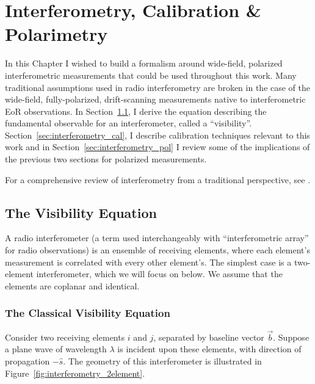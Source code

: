 \chapter{Interferometry, Calibration \& Polarimetry}
\label{chapter:interferometry}

In this Chapter I wished to build a formalism around wide-field, polarized interferometric measurements that could be used throughout this work. Many traditional assumptions used in radio interferometry are broken in the case of the wide-field, fully-polarized, drift-scanning measurements native to interferometric EoR observations. In Section~\ref{sec:interferometry_vis}, I derive the equation describing the fundamental observable for an interferometer, called a ``visibility''. Section~\ref{sec:interferometry_cal}, I describe calibration techniques relevant to this work and in Section~\ref{sec:interferometry_pol} I review some of the implications of the previous two sections for polarized measurements.

For a comprehensive review of interferometry from a traditional perspective, see \cite{TMS}.

\section{The Visibility Equation}
\label{sec:interferometry_vis}

A radio interferometer (a term used interchangeably with ``interferometric array'' for radio observations) is an ensemble of receiving elements, where each element's measurement is correlated with every other element's. The simplest case is a two-element interferometer, which we will focus on below. We assume that the elements are coplanar and identical.

\subsection{The Classical Visibility Equation}

Consider two receiving elements $i$ and $j$, separated by baseline vector $\vec{b}$. Suppose a plane wave of wavelength $\lambda$ is incident upon these elements, with direction of propagation $-\hat{s}$. The geometry of this interferometer is illustrated in Figure~\ref{fig:interferometry_2element}.

